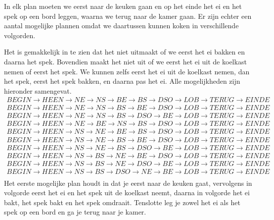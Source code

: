 \documentclass[alternative-exam.tex]{subfiles}
\begin{document}
In elk plan moeten we eerst naar de keuken gaan en op het einde het ei en het spek op een bord leggen, waarna we terug naar de kamer gaan. Er zijn echter een aantal mogelijke plannen omdat we daartussen kunnen koken in verschillende volgorden.

Het is gemakkelijk in te zien dat het niet uitmaakt of we eerst het ei bakken en daarna het spek. Bovendien maakt het niet uit of we eerst het ei uit de koelkast nemen of eerst het spek. We kunnen zelfs eerst het ei uit de koelkast nemen, dan het spek, eerst het spek bakken, en daarna pas het ei. Alle mogelijkheden zijn hieronder samengevat.
\[
\begin{array}{c}
BEGIN \rightarrow HEEN \rightarrow NE \rightarrow NS \rightarrow BE \rightarrow BS \rightarrow DSO\rightarrow LOB \rightarrow TERUG \rightarrow EINDE\\
BEGIN \rightarrow HEEN \rightarrow NE \rightarrow NS \rightarrow BS \rightarrow BE \rightarrow DSO\rightarrow LOB \rightarrow TERUG \rightarrow EINDE\\
BEGIN \rightarrow HEEN \rightarrow NE \rightarrow NS \rightarrow BS \rightarrow DSO \rightarrow BE\rightarrow LOB \rightarrow TERUG \rightarrow EINDE\\
BEGIN \rightarrow HEEN \rightarrow NE \rightarrow BE \rightarrow NS \rightarrow BS \rightarrow DSO\rightarrow LOB \rightarrow TERUG \rightarrow EINDE\\
BEGIN \rightarrow HEEN \rightarrow NS \rightarrow NE \rightarrow BE \rightarrow BS \rightarrow DSO\rightarrow LOB \rightarrow TERUG \rightarrow EINDE\\
BEGIN \rightarrow HEEN \rightarrow NS \rightarrow NE \rightarrow BS \rightarrow BE \rightarrow DSO\rightarrow LOB \rightarrow TERUG \rightarrow EINDE\\
BEGIN \rightarrow HEEN \rightarrow NS \rightarrow NE \rightarrow BS \rightarrow DSO \rightarrow BE\rightarrow LOB \rightarrow TERUG \rightarrow EINDE\\
BEGIN \rightarrow HEEN \rightarrow NS \rightarrow BS \rightarrow NE \rightarrow BE \rightarrow DSO\rightarrow LOB \rightarrow TERUG \rightarrow EINDE\\
BEGIN \rightarrow HEEN \rightarrow NS \rightarrow BS \rightarrow NE \rightarrow DSO \rightarrow BE\rightarrow LOB \rightarrow TERUG \rightarrow EINDE\\
BEGIN \rightarrow HEEN \rightarrow NS \rightarrow BS \rightarrow DSO \rightarrow NE \rightarrow BE\rightarrow LOB \rightarrow TERUG \rightarrow EINDE\\
\end{array}
\]
Het eerste mogelijke plan houdt in dat je eerst naar de keuken gaat, vervolgens in volgorde eerst het ei en het spek uit de koelkast neemt, daarna in volgorde het ei bakt, het spek bakt en het spek omdraait. Tenslotte leg je zowel het ei als het spek op een bord en ga je terug naar je kamer.
\end{document}
